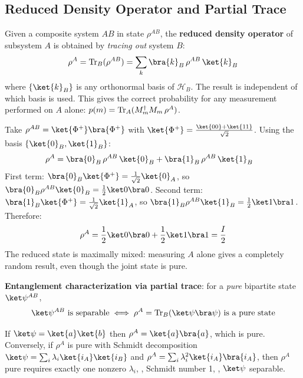 \documentclass[oneside]{academica}
\begin{document}
\subsection{Reduced Density Operator and Partial Trace}

Given a composite system $AB$ in state $\rho^{AB}$, the \textbf{reduced density operator} of subsystem $A$ is obtained by \emph{tracing out} system $B$:
\begin{equation*}
  \rho^A=\tr_B(\rho^{AB})=\sum_k\bra{k}_B\,\rho^{AB}\,\ket{k}_B
\end{equation*}
where $\{\ket{k}_B\}$ is any orthonormal basis of $\mathcal{H}_B$.
The result is independent of which basis is used.
This gives the correct probability for any measurement performed on $A$ alone: $p(m)=\operatorname{Tr}_A(M_m^\dagger M_m\,\rho^A)$.

\begin{example*}
  Take $\rho^{AB}=\ket{\Phi^+}\bra{\Phi^+}$ with $\ket{\Phi^+}=\frac{\ket{00}+\ket{11}}{\sqrt{2}}$.
  Using the basis $\{\ket{0}_B,\ket{1}_B\}$:
  \begin{align*}
    \rho^A &= \bra{0}_B\,\rho^{AB}\,\ket{0}_B + \bra{1}_B\,\rho^{AB}\,\ket{1}_B
  \end{align*}
  First term: $\bra{0}_B\ket{\Phi^+}=\frac{1}{\sqrt2}\ket{0}_A$, so $\bra{0}_B\rho^{AB}\ket{0}_B=\frac12\ket0\bra0$.
  Second term: $\bra{1}_B\ket{\Phi^+}=\frac{1}{\sqrt2}\ket{1}_A$, so $\bra{1}_B\rho^{AB}\ket{1}_B=\frac12\ket1\bra1$.
  Therefore:
  \begin{equation*}
    \rho^A=\frac12\ket0\bra0+\frac12\ket1\bra1=\frac{I}{2}
  \end{equation*}
  The reduced state is maximally mixed: measuring $A$ alone gives a completely random result, even though the joint state is pure.
\end{example*}

\textbf{Entanglement characterization via partial trace}: for a \emph{pure} bipartite state $\ket\psi^{AB}$,
\begin{equation*}
  \ket\psi^{AB} \text{ is separable} \iff \rho^A = \tr_B(\ket\psi\bra\psi) \text{ is a pure state}
\end{equation*}
\begin{proof*}
  If $\ket\psi=\ket{a}\ket{b}$ then $\rho^A=\ket{a}\bra{a}$, which is pure.
  Conversely, if $\rho^A$ is pure with Schmidt decomposition $\ket\psi=\sum_i\lambda_i\ket{i_A}\ket{i_B}$ and $\rho^A=\sum_i\lambda_i^2\ket{i_A}\bra{i_A}$, then $\rho^A$ pure requires exactly one nonzero $\lambda_i$, \ie, Schmidt number 1, \ie, $\ket\psi$ separable.
\end{proof*}
\end{document}
